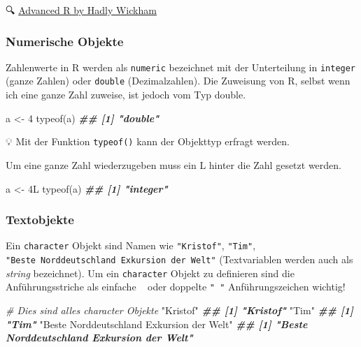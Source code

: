 \documentclass[
]{article}
\newenvironment{Shaded}{\begin{snugshade}}{\end{snugshade}}
\newcommand{\CommentTok}[1]{\textcolor[rgb]{0.56,0.35,0.01}{\textit{#1}}}
\newcommand{\DecValTok}[1]{\textcolor[rgb]{0.00,0.00,0.81}{#1}}
\newcommand{\DocumentationTok}[1]{\textcolor[rgb]{0.56,0.35,0.01}{\textbf{\textit{#1}}}}
\newcommand{\FunctionTok}[1]{\textcolor[rgb]{0.00,0.00,0.00}{#1}}
\newcommand{\NormalTok}[1]{#1}
\newcommand{\OtherTok}[1]{\textcolor[rgb]{0.56,0.35,0.01}{#1}}
\newcommand{\StringTok}[1]{\textcolor[rgb]{0.31,0.60,0.02}{#1}}
\begin{document}
🔍 \href{https://adv-r.hadley.nz/}{Advanced R by Hadly Wickham}

\hypertarget{numerische-objekte}{%
\subsubsection{Numerische Objekte}\label{numerische-objekte}}

Zahlenwerte in R werden als \texttt{numeric} bezeichnet mit der Unterteilung in \texttt{integer} (ganze Zahlen) oder \texttt{double} (Dezimalzahlen). Die Zuweisung von R, selbst wenn ich eine ganze Zahl zuweise, ist jedoch vom Typ double.

\begin{Shaded}
\begin{Highlighting}[]
\NormalTok{a }\OtherTok{\textless{}{-}} \DecValTok{4}
\FunctionTok{typeof}\NormalTok{(a)}
\DocumentationTok{\#\# [1] "double"}
\end{Highlighting}
\end{Shaded}

💡 Mit der Funktion \texttt{typeof()} kann der Objekttyp erfragt werden.

Um eine ganze Zahl wiederzugeben muss ein L hinter die Zahl gesetzt werden.

\begin{Shaded}
\begin{Highlighting}[]
\NormalTok{a }\OtherTok{\textless{}{-}}\NormalTok{ 4L}
\FunctionTok{typeof}\NormalTok{(a)}
\DocumentationTok{\#\# [1] "integer"}
\end{Highlighting}
\end{Shaded}

\hypertarget{textobjekte}{%
\subsubsection{Textobjekte}\label{textobjekte}}

Ein \texttt{character} Objekt sind Namen wie \texttt{"Kristof"}, \texttt{"Tim"}, \texttt{"Beste\ Norddeutschland\ Exkursion\ der\ Welt"} (Textvariablen werden auch als \emph{string} bezeichnet). Um ein \texttt{character} Objekt zu definieren sind die Anführungsstriche als einfache \texttt{\textquotesingle{}\ \textquotesingle{}} oder doppelte \texttt{"\ "} Anführungszeichen wichtig!

\begin{Shaded}
\begin{Highlighting}[]
\CommentTok{\# Dies sind alles character Objekte }
\StringTok{"Kristof"}
\DocumentationTok{\#\# [1] "Kristof"}
\StringTok{"Tim"}
\DocumentationTok{\#\# [1] "Tim"}
\StringTok{"Beste Norddeutschland Exkursion der Welt"}
\DocumentationTok{\#\# [1] "Beste Norddeutschland Exkursion der Welt"}
\end{Highlighting}
\end{Shaded}
\end{document}
